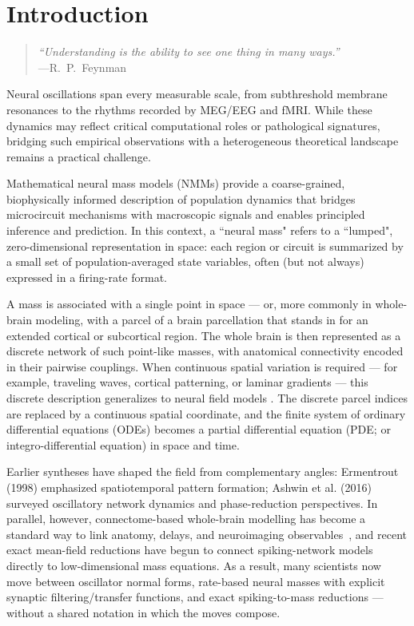 \documentclass[11pt]{article}
\numberwithin{equation}{section}
\newcommand{\rev}[1]{\begingroup\color{black}#1\endgroup}
\begin{document}
\setcounter{tocdepth}{2}
\tableofcontents

\clearpage


\section{Introduction} 

\begin{quote}
\emph{``Understanding is the ability to see one thing in many ways.''}\\[4pt]
\hfill ---R.~P.~Feynman
\end{quote}

  \rev{Neural oscillations span every measurable scale, from subthreshold membrane resonances to the rhythms recorded by MEG/EEG and fMRI. While these dynamics may reflect critical computational roles or pathological signatures, bridging such empirical observations with a heterogeneous theoretical landscape remains a practical challenge.
  
Mathematical neural mass models (NMMs) provide a coarse-grained, biophysically informed description of population dynamics that bridges microcircuit mechanisms with macroscopic signals and enables principled inference and prediction. In this context, a ``neural mass" refers to a ``lumped", zero-dimensional representation in space: each region or circuit is summarized by a small set of population-averaged state variables, often (but not always) expressed in a firing-rate format. 

A mass is associated with a single point in space — or, more commonly in whole-brain modeling, with a parcel of a brain parcellation that stands in for an extended cortical or subcortical region. The whole brain is then represented as a discrete network of such point-like masses, with anatomical connectivity encoded in their pairwise couplings. When continuous spatial variation is required — for example, traveling waves, cortical patterning, or laminar gradients — this discrete description generalizes to neural field models \cite{coombes2014}. The discrete parcel indices are replaced by a continuous spatial coordinate, and the finite system of ordinary differential equations (ODEs) becomes a partial differential equation (PDE; or integro-differential equation) in space and time.
  
Earlier syntheses have shaped the field from complementary angles: Ermentrout (1998) \cite{ermentrout1998neural} emphasized spatiotemporal pattern formation; Ashwin et al. (2016) \cite{ashwin2016mathematical} surveyed oscillatory network dynamics and phase-reduction perspectives. In parallel, however, connectome-based whole-brain modelling has become a standard way to link anatomy, delays, and neuroimaging observables~\cite{deco_dynamic_2008,cabral_role_2011,DavidFriston2003,castaldo2023multi,sanchez-todoPhysicalNeuralMass2023,breakspearDynamicModelsLargescale2017}, and recent exact mean-field reductions have begun to connect spiking-network models directly to low-dimensional mass equations. As a result, many scientists now move between oscillator normal forms, rate-based neural masses with explicit synaptic filtering/transfer functions, and exact spiking-to-mass reductions — without a shared notation in which the moves compose.}
\end{document}
